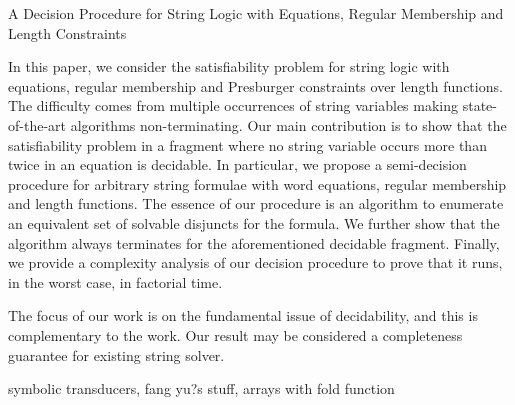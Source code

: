 
A Decision Procedure for String Logic with Equations, Regular Membership and Length Constraints \cite{L16}

In this paper, we consider the satisfiability problem for string logic with equations, regular membership and Presburger constraints over length functions. The difficulty comes from multiple occurrences of string variables making state-of-the-art algorithms non-terminating. Our main contribution is to show that the satisfiability problem in a fragment where no string variable occurs more than twice in an equation is decidable. In particular, we propose a semi-decision procedure for arbitrary string formulae with word equations, regular membership and length functions. The essence of our procedure is an algorithm to enumerate an equivalent set of solvable disjuncts for the formula. We further show that the algorithm always terminates for the aforementioned decidable fragment. Finally, we provide a complexity analysis of our decision procedure to prove that it runs, in the worst case, in factorial time.

The focus of our work is on the fundamental issue of decidability, and this is complementary to the work. Our result may be considered a completeness guarantee for existing string solver. 
 
symbolic transducers, fang yu?s stuff, arrays with fold function
 
